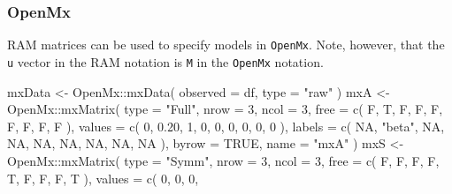\documentclass[
]{book}
\newenvironment{Shaded}{\begin{snugshade}}{\end{snugshade}}
\newcommand{\AttributeTok}[1]{\textcolor[rgb]{0.77,0.63,0.00}{#1}}
\newcommand{\ConstantTok}[1]{\textcolor[rgb]{0.00,0.00,0.00}{#1}}
\newcommand{\DecValTok}[1]{\textcolor[rgb]{0.00,0.00,0.81}{#1}}
\newcommand{\FloatTok}[1]{\textcolor[rgb]{0.00,0.00,0.81}{#1}}
\newcommand{\FunctionTok}[1]{\textcolor[rgb]{0.00,0.00,0.00}{#1}}
\newcommand{\NormalTok}[1]{#1}
\newcommand{\OtherTok}[1]{\textcolor[rgb]{0.56,0.35,0.01}{#1}}
\newcommand{\SpecialCharTok}[1]{\textcolor[rgb]{0.00,0.00,0.00}{#1}}
\newcommand{\StringTok}[1]{\textcolor[rgb]{0.31,0.60,0.02}{#1}}
\theoremstyle{definition}
\theoremstyle{definition}
\theoremstyle{definition}
\theoremstyle{remark}
\begin{document}
\hypertarget{openmx-openmx2020}{%
\subsubsection{\texorpdfstring{OpenMx \citep{OpenMx2020}}{OpenMx {[}@OpenMx2020{]}}}\label{openmx-openmx2020}}

RAM matrices can be used to specify models in \texttt{OpenMx}.
Note, however, that the \texttt{u} vector in the RAM notation is
\texttt{M} in the \texttt{OpenMx} notation.

\begin{Shaded}
\begin{Highlighting}[]
\NormalTok{mxData }\OtherTok{\textless{}{-}}\NormalTok{ OpenMx}\SpecialCharTok{::}\FunctionTok{mxData}\NormalTok{(}
  \AttributeTok{observed =}\NormalTok{ df,}
  \AttributeTok{type =} \StringTok{"raw"}
\NormalTok{)}
\NormalTok{mxA }\OtherTok{\textless{}{-}}\NormalTok{ OpenMx}\SpecialCharTok{::}\FunctionTok{mxMatrix}\NormalTok{(}
  \AttributeTok{type =} \StringTok{"Full"}\NormalTok{,}
  \AttributeTok{nrow =} \DecValTok{3}\NormalTok{,}
  \AttributeTok{ncol =} \DecValTok{3}\NormalTok{,}
  \AttributeTok{free =} \FunctionTok{c}\NormalTok{(}
\NormalTok{    F, T, F,}
\NormalTok{    F, F, F,}
\NormalTok{    F, F, F}
\NormalTok{  ),}
  \AttributeTok{values =} \FunctionTok{c}\NormalTok{(}
    \DecValTok{0}\NormalTok{, }\FloatTok{0.20}\NormalTok{, }\DecValTok{1}\NormalTok{,}
    \DecValTok{0}\NormalTok{, }\DecValTok{0}\NormalTok{, }\DecValTok{0}\NormalTok{,}
    \DecValTok{0}\NormalTok{, }\DecValTok{0}\NormalTok{, }\DecValTok{0}
\NormalTok{  ),}
  \AttributeTok{labels =} \FunctionTok{c}\NormalTok{(}
    \ConstantTok{NA}\NormalTok{, }\StringTok{"beta"}\NormalTok{, }\ConstantTok{NA}\NormalTok{,}
    \ConstantTok{NA}\NormalTok{, }\ConstantTok{NA}\NormalTok{, }\ConstantTok{NA}\NormalTok{,}
    \ConstantTok{NA}\NormalTok{, }\ConstantTok{NA}\NormalTok{, }\ConstantTok{NA}
\NormalTok{  ),}
  \AttributeTok{byrow =} \ConstantTok{TRUE}\NormalTok{,}
  \AttributeTok{name =} \StringTok{"mxA"}
\NormalTok{)}
\NormalTok{mxS }\OtherTok{\textless{}{-}}\NormalTok{ OpenMx}\SpecialCharTok{::}\FunctionTok{mxMatrix}\NormalTok{(}
  \AttributeTok{type =} \StringTok{"Symm"}\NormalTok{,}
  \AttributeTok{nrow =} \DecValTok{3}\NormalTok{,}
  \AttributeTok{ncol =} \DecValTok{3}\NormalTok{,}
  \AttributeTok{free =} \FunctionTok{c}\NormalTok{(}
\NormalTok{    F, F, F,}
\NormalTok{    F, T, F,}
\NormalTok{    F, F, T}
\NormalTok{  ),}
  \AttributeTok{values =} \FunctionTok{c}\NormalTok{(}
    \DecValTok{0}\NormalTok{, }\DecValTok{0}\NormalTok{, }\DecValTok{0}\NormalTok{,}

\end{Highlighting}
\end{Shaded}
\end{document}

